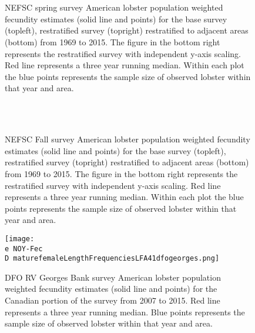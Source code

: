 \documentclass[11pt]{article}
\newcommand{\D}{.}
\newcommand{\e}{/backup/bio_data/bio.lobster/figures/} %
\begin{document}
\begin{figure}
\centering
{}
\\
\\

\caption{NEFSC spring survey American lobster population weighted fecundity estimates (solid line and points) for the base survey (topleft), restratified survey (topright) restratified to adjacent areas (bottom) from 1969 to 2015. The figure in the bottom right represents the restratified survey with independent y-axis scaling. Red line represents a three year running median. Within each plot the blue points represents the sample size of observed lobster within that year and area. }
\end{figure}
\clearpage



\begin{figure}
\centering
{}
\\
\\

\caption{NEFSC Fall survey American lobster population weighted fecundity estimates (solid line and points) for the base survey (topleft), restratified survey (topright) restratified to adjacent areas (bottom) from 1969 to 2015. The figure in the bottom right represents the restratified survey with independent y-axis scaling. Red line represents a three year running median. Within each plot the blue points represents the sample size of observed lobster within that year and area. }
\end{figure}
\clearpage


\begin{figure}

    \texttt{[image: \\e NOY-Fec\\D maturefemaleLengthFrequenciesLFA41dfogeorges.png]}
    \caption{DFO RV Georges Bank survey American lobster population weighted fecundity estimates (solid line and points) for the Canadian portion of the survey from 2007 to 2015. Red line represents a three year running median. Blue points represents the sample size of observed lobster within that year and area.}

\end{figure}
\end{document}
